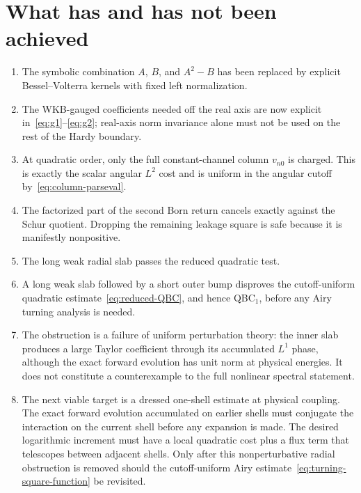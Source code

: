 \documentclass[11pt]{article}
\theoremstyle{definition}
\begin{document}
\section{What has and has not been achieved}

\begin{enumerate}[leftmargin=*,itemsep=2pt,topsep=3pt]
\small
 \item The symbolic combination $A$, $B$, and $A^2-B$ has been replaced by explicit Bessel--Volterra kernels with fixed left normalization.
 \item The WKB-gauged coefficients needed off the real axis are now explicit in~\eqref{eq:g1}--\eqref{eq:g2}; real-axis norm invariance alone must not be used on the rest of the Hardy boundary.
 \item At quadratic order, only the full constant-channel column $v_{n0}$ is charged.  This is exactly the scalar angular $L^2$ cost and is uniform in the angular cutoff by~\eqref{eq:column-parseval}.
 \item The factorized part of the second Born return cancels exactly against the Schur quotient.  Dropping the remaining leakage square is safe because it is manifestly nonpositive.
 \item The long weak radial slab passes the reduced quadratic test.
 \item A long weak slab followed by a short outer bump disproves the cutoff-uniform quadratic estimate~\eqref{eq:reduced-QBC}, and hence QBC$_1$, before any Airy turning analysis is needed.
 \item The obstruction is a failure of uniform perturbation theory: the inner slab produces a large Taylor coefficient through its accumulated $L^1$ phase, although the exact forward evolution has unit norm at physical energies.  It does not constitute a counterexample to the full nonlinear spectral statement.
 \item The next viable target is a dressed one-shell estimate at physical coupling.  The exact forward evolution accumulated on earlier shells must conjugate the interaction on the current shell before any expansion is made.  The desired logarithmic increment must have a local quadratic cost plus a flux term that telescopes between adjacent shells.  Only after this nonperturbative radial obstruction is removed should the cutoff-uniform Airy estimate~\eqref{eq:turning-square-function} be revisited.
\end{enumerate}
\normalsize
\end{document}
